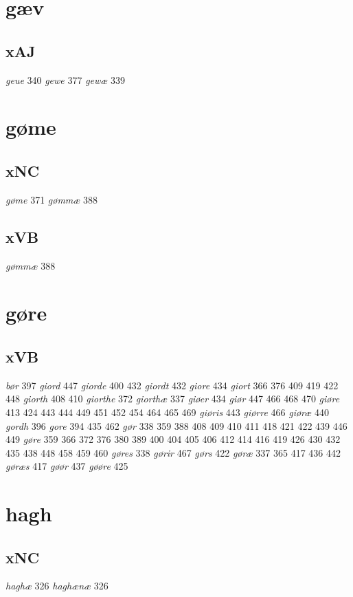 \documentclass[a4paper,twocolumn]{article}
\begin{document}
\section{gæv}
\label{sec:org2d9e189}
\subsection{xAJ}
\label{sec:org5ebcd6a}
\emph{geue} 340 \emph{gewe} 377 \emph{gewæ} 339 
\section{gøme}
\label{sec:org413d92b}
\subsection{xNC}
\label{sec:orge305e6d}
\emph{gøme} 371 \emph{gømmæ} 388 
\subsection{xVB}
\label{sec:orge860917}
\emph{gømmæ} 388 
\section{gøre}
\label{sec:orgf549872}
\subsection{xVB}
\label{sec:org042f959}
\emph{bør} 397 \emph{giord} 447 \emph{giorde} 400 432 \emph{giordt} 432 \emph{giore} 434 \emph{giort} 366 376 409 419 422 448 \emph{giorth} 408 410 \emph{giorthe} 372 \emph{giorthæ} 337 \emph{giøer} 434 \emph{giør} 447 466 468 470 \emph{giøre} 413 424 443 444 449 451 452 454 464 465 469 \emph{giøris} 443 \emph{giørre} 466 \emph{giøræ} 440 \emph{gordh} 396 \emph{gore} 394 435 462 \emph{gør} 338 359 388 408 409 410 411 418 421 422 439 446 449 \emph{gøre} 359 366 372 376 380 389 400 404 405 406 412 414 416 419 426 430 432 435 438 448 458 459 460 \emph{gøres} 338 \emph{gørir} 467 \emph{gørs} 422 \emph{gøræ} 337 365 417 436 442 \emph{gøræs} 417 \emph{gøør} 437 \emph{gøøre} 425 
\section{hagh}
\label{sec:orgbc3d56c}
\subsection{xNC}
\label{sec:orge5d905a}
\emph{haghæ} 326 \emph{haghænæ} 326 
\end{document}
